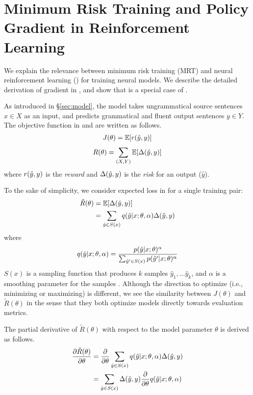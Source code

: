 \section{Minimum Risk Training and Policy Gradient in Reinforcement Learning}
\setlength{\abovedisplayskip}{3.0pt} %
\setlength{\belowdisplayskip}{3.0pt} %
\label{sec:appendix}
We explain the relevance between minimum risk training (MRT) \cite{shen-EtAl:2016:P16-1} and neural reinforcement learning (\proposed) for training neural \encdec models.
We describe the detailed derivation of gradient in \mrt, and show that \mrt is a special case of \proposed.

As introduced in \S \ref{sec:model}, the model takes ungrammatical source sentences $x \in X$ as an input, and predicts grammatical and fluent output sentences $y \in Y$.
The objective function in \proposed and \mrt are written as follows.
\begin{align}
\label{eq:j}
J(\theta)= \mathbb{E}[r(\hat{y},y)]
\end{align}
\begin{align}
\label{eq:partialr}
R(\theta) =\sum_{(X,Y)} \mathbb{E}[\Delta(\hat{y},y)]
\end{align}
where $r(\hat{y},y)$ is the {\em reward} and $\Delta(\hat{y},y)$ is the {\em risk} for an output ($\hat{y}$).

To the sake of simplicity, we consider expected loss in \mrt for a single training pair:
\begin{align}
\tilde{R}(\theta) &= \mathbb{E}[\Delta(\hat{y},y)] \nonumber \\
    &= \sum_{\hat{y} \in S(x)} q(\hat{y}|x;\theta,\alpha) \Delta(\hat{y},y)
\end{align}
where
\begin{align}
\label{eq:softmax}
q(\hat{y}|x;\theta,\alpha) = \frac{p(\hat{y}| x;\theta)^\alpha}{\sum_{\hat{y}' \in S(x)} p(\hat{y}'| x;\theta)^\alpha}
\end{align}
$S(x)$ is a sampling function that produces $k$ samples $\hat{y}_1, ... \hat{y}_k$, and $\alpha$ is a smoothing parameter for the samples \cite{och:2003:ACL}.
Although the direction to optimize (i.e., minimizing or maximizing) is different, we see the similarity between $J(\theta)$ and $\tilde{R}(\theta)$ in the sense that they both optimize models directly towards evaluation metrics.

The partial derivative of $\tilde{R}(\theta)$ with respect to the model parameter $\theta$ is derived as follows. 
\begin{align}
\label{eq:partialrtilde}
\frac {\partial \tilde{R}(\theta)}{\partial \theta} &= \frac {\partial }{\partial \theta} \sum_{\hat{y} \in S(x)} q(\hat{y}|x;\theta,\alpha) \Delta(\hat{y},y) \nonumber \\
    &= \sum_{\hat{y} \in S(x)} \Delta(\hat{y},y) \frac {\partial}{\partial \theta} q(\hat{y}|x;\theta,\alpha)
\end{align}

